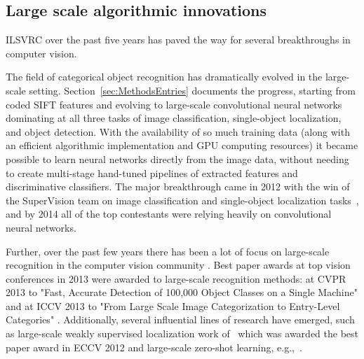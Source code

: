
\subsection{Large scale algorithmic innovations}
\label{sec:MethodsDeep}

ILSVRC over the past five years has paved the way for several breakthroughs in computer vision. 

The field of categorical object recognition has dramatically evolved in the large-scale setting. 
Section~\ref{sec:MethodsEntries} documents the progress, starting from coded SIFT features and evolving to large-scale
convolutional neural networks dominating at all three tasks of image classification, single-object localization, and object detection. With the availability of so much training data (along with an efficient algorithmic implementation and GPU computing resources) it became possible to learn neural networks directly from the image data, without needing to create  multi-stage hand-tuned pipelines of extracted features and discriminative classifiers. The major breakthrough came in 2012 with the win of the SuperVision team on image classification and single-object localization tasks~\citep{Krizhevsky12}, and by 2014 all of the top contestants were relying heavily on convolutional neural networks. 


Further, over the past few years there has been a lot of focus on large-scale recognition in the computer vision community . Best paper awards at top vision conferences in 2013 were awarded to large-scale recognition methods: at CVPR 2013 to "Fast, Accurate Detection of 100,000 Object Classes on a Single Machine" \citep{Dean13} and at ICCV 2013 to "From Large Scale Image Categorization to Entry-Level Categories" \citep{Ordonez13}. Additionally, several influential lines of research have emerged, such as large-scale weakly supervised localization work of~\citep{Kuettel12}
which was awarded the best paper award in ECCV 2012 and large-scale zero-shot learning, e.g.,~\citep{Frome13}. 




